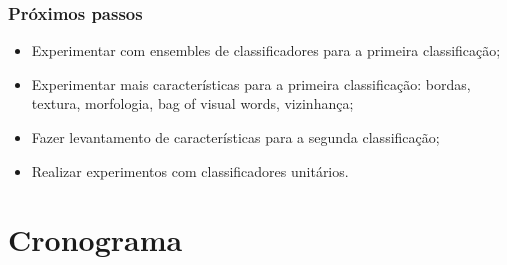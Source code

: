 \documentclass[t]{beamer}
\begin{document}
\begin{frame}
	\frametitle{Próximos passos}

	\begin{itemize}
		\item Experimentar com ensembles de classificadores para a primeira classificação;
		\item Experimentar mais características para a primeira classificação: bordas, textura, morfologia, bag of visual words, vizinhança;
		\item Fazer levantamento de características para a segunda classificação;
		\item Realizar experimentos com classificadores unitários.
	\end{itemize}

\end{frame}

\section{Cronograma}
\end{document}
